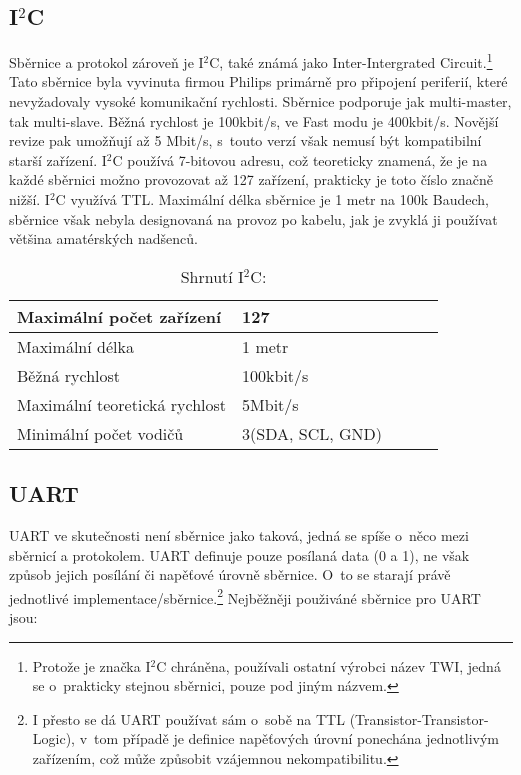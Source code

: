 \documentclass[12pt]{article}
\begin{document}
   
   \subsection{I$^{2}$C}
   Sběrnice a protokol zároveň je I$^{2}$C,
   také známá jako Inter-Intergrated Circuit.\footnote{ Protože je značka I$^{2}$C chráněna, používali ostatní výrobci název TWI, jedná se o~prakticky stejnou sběrnici, pouze pod jiným názvem.}
   Tato sběrnice byla vyvinuta firmou Philips primárně pro připojení periferií, které nevyžadovaly vysoké komunikační rychlosti.
   Sběrnice podporuje jak multi-master, tak multi-slave.
   Běžná rychlost je 100kbit/s, ve Fast modu je 400kbit/s. Novější revize pak umožňují až 5 Mbit/s, s~touto verzí však nemusí být kompatibilní starší zařízení.
   I$^{2}$C používá 7-bitovou adresu, což teoreticky znamená, že je na každé sběrnici možno provozovat až 127 zařízení, prakticky je toto číslo značně nižší.
   I$^{2}$C využívá TTL.
   Maximální délka sběrnice je 1 metr na 100k Baudech, sběrnice však nebyla designovaná na provoz po kabelu, jak je zvyklá ji používat většina amatérských nadšenců.
   
   \begin{table}[h]
   	
   	\centering
   	\begin{tabular}{|l|l|l|l|l|} \hline
   		Maximální počet zařízení      & 127              \\ \hline
   		Maximální délka               & 1 metr           \\ \hline
   		Běžná rychlost                & 100kbit/s        \\ \hline
   		Maximální teoretická rychlost & 5Mbit/s          \\ \hline
   		Minimální počet vodičů        & 3(SDA, SCL, GND) \\ \hline
   	\end{tabular}
   	\caption{Shrnutí I$^{2}$C:}
   \end{table}
   
   
   \subsection{UART}

   UART ve skutečnosti není sběrnice jako taková, jedná se spíše o~něco mezi sběrnicí a protokolem.
   UART definuje pouze posílaná data (0 a 1), ne však způsob jejich posílání či napěťové úrovně sběrnice.
   O~to se starají právě jednotlivé implementace/sběrnice.\footnote{I přesto se dá UART používat sám o~sobě na TTL (Transistor-Transistor-Logic), v~tom případě je definice napěťových úrovní ponechána jednotlivým zařízením, což může způsobit vzájemnou nekompatibilitu.}
   Nejběžněji použiváné sběrnice pro UART jsou:
\end{document}
